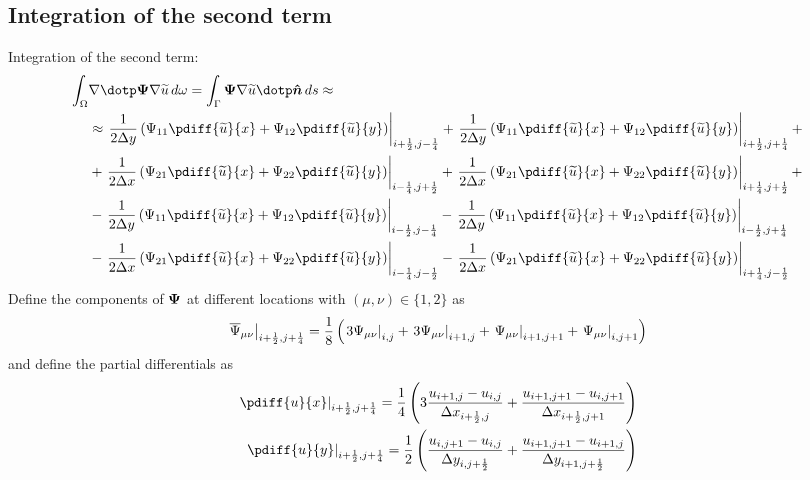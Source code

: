 \subsection*{Integration of the second term}
Integration of the second term:
%
\begin{align}
    \int_\Omega & \nabla \dotp \bPsi \nabla \widetilde{u}\, d\omega  =
    \int_\Gamma \bPsi \nabla \widetilde{u} \dotp \vec{\hat n}\, ds \approx
    \\
    & \approx
    \left. \frac{1}{2\Dy}\left( \Psi_{11} \pdiff{\widetilde{u}}{x} + \Psi_{12} \pdiff{\widetilde{u}}{y} \right) \right|_{i+\half,j-\quart}
    + \left. \frac{1}{2\Dy} \left( \Psi_{11} \pdiff{\widetilde{u}}{x} + \Psi_{12} \pdiff{\widetilde{u}}{y} \right) \right|_{i+\half,j+\quart} +
    \\
    &
    + \left. \frac{1}{2\Dx} \left( \Psi_{21} \pdiff{\widetilde{u}}{x} + \Psi_{22} \pdiff{\widetilde{u}}{y} \right) \right|_{i-\quart,j+\half}
    + \left. \frac{1}{2\Dx} \left( \Psi_{21} \pdiff{\widetilde{u}}{x} + \Psi_{22} \pdiff{\widetilde{u}}{y} \right) \right|_{i+\quart,j+\half} +
    \\
    &
    -  \left. \frac{1}{2\Dy} \left( \Psi_{11} \pdiff{\widetilde{u}}{x} + \Psi_{12} \pdiff{\widetilde{u}}{y} \right) \right|_{i-\half,j-\quart}
    -  \left. \frac{1}{2\Dy} \left( \Psi_{11} \pdiff{\widetilde{u}}{x} + \Psi_{12} \pdiff{\widetilde{u}}{y} \right) \right|_{i-\half,j+\quart}
    \\
    &
    - \left. \frac{1}{2\Dx} \left( \Psi_{21} \pdiff{\widetilde{u}}{x} + \Psi_{22} \pdiff{\widetilde{u}}{y} \right)  \right|_{i-\quart,j-\half}
    - \left. \frac{1}{2\Dx} \left( \Psi_{21} \pdiff{\widetilde{u}}{x} + \Psi_{22} \pdiff{\widetilde{u}}{y} \right)  \right|_{i+\quart,j-\half}
\end{align}
%
Define the components of $\boldsymbol{\Psi}$ at different locations with $(\mu, \nu) \in \{ 1, 2\}$ as
%
\begin{align}
    \left. \overline\Psi_{\mu\nu} \right|_{i+\frac{1}{2},j+\frac{1}{4}} = \frac{1}{8} \left(\left. 3\Psi_{\mu\nu} \right|_{i,j}
    + \left. 3\Psi_{\mu\nu} \right|_{i+1,j} + \left. \Psi_{\mu\nu} \right|_{i+1,j+1}  + \left. \Psi_{\mu\nu} \right|_{i,j+1}\right)
\end{align}
%
and define the partial differentials as
\begin{align}
    \left. \pdiff{u}{x} \right|_{i+\half,j+\quart} =  \quart \left(3\frac{u_{i+1,j} - u_{i,j}}{\Dx_{i+\half,j}} + \frac{u_{i+1,j+1} - u_{i,j+1}}{\Dx_{i+\half,j+1}}\right)
    \\
    \left. \pdiff{u}{y} \right|_{i+\half,j+\quart} =  \half \left(\frac{u_{i,j+1} - u_{i,j}}{\Dy_{i,j+\half}} + \frac{u_{i+1,j+1} - u_{i+1,j}}{\Dy_{i+1,j+\half}}\right)
\end{align}
